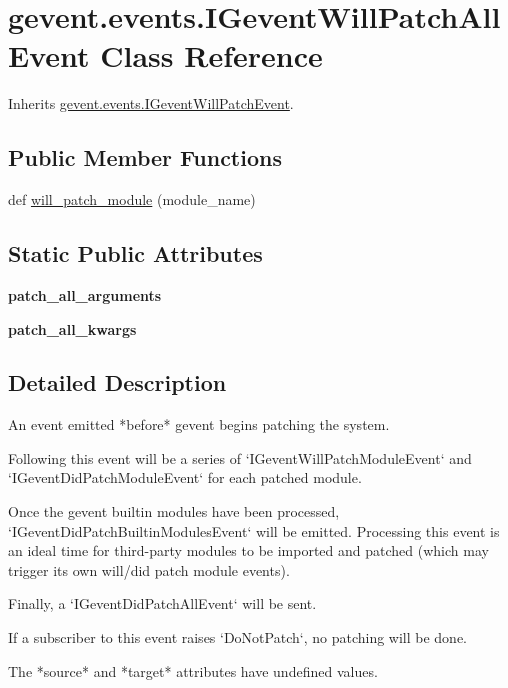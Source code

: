 \hypertarget{classgevent_1_1events_1_1_i_gevent_will_patch_all_event}{}\section{gevent.\+events.\+I\+Gevent\+Will\+Patch\+All\+Event Class Reference}
\label{classgevent_1_1events_1_1_i_gevent_will_patch_all_event}


Inherits \hyperlink{classgevent_1_1events_1_1_i_gevent_will_patch_event}{gevent.\+events.\+I\+Gevent\+Will\+Patch\+Event}.

\subsection*{Public Member Functions}
\begin{DoxyCompactItemize}
\item 
def \hyperlink{classgevent_1_1events_1_1_i_gevent_will_patch_all_event_ab1163084e4ac5f610ff6ddf84635cf42}{will\+\_\+patch\+\_\+module} (module\+\_\+name)
\end{DoxyCompactItemize}
\subsection*{Static Public Attributes}
\begin{DoxyCompactItemize}
\item 
{\bfseries patch\+\_\+all\+\_\+arguments}
\item 
{\bfseries patch\+\_\+all\+\_\+kwargs}
\end{DoxyCompactItemize}


\subsection{Detailed Description}
\begin{DoxyVerb}An event emitted *before* gevent begins patching the system.

Following this event will be a series of
`IGeventWillPatchModuleEvent` and `IGeventDidPatchModuleEvent` for
each patched module.

Once the gevent builtin modules have been processed,
`IGeventDidPatchBuiltinModulesEvent` will be emitted. Processing
this event is an ideal time for third-party modules to be imported
and patched (which may trigger its own will/did patch module
events).

Finally, a `IGeventDidPatchAllEvent` will be sent.

If a subscriber to this event raises `DoNotPatch`, no patching
will be done.

The *source* and *target* attributes have undefined values.
\end{DoxyVerb}
 

